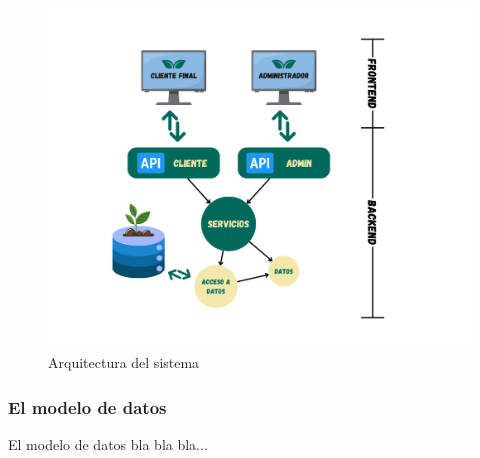 \begin{figure}[ht!]
    \centering
    \includegraphics[width=1\textwidth]{Images/architecture.png}
    \caption{Arquitectura del sistema}
    \label{fig:architecture}
\end{figure}

\subsubsection{El modelo de datos}
El modelo de datos bla bla bla...